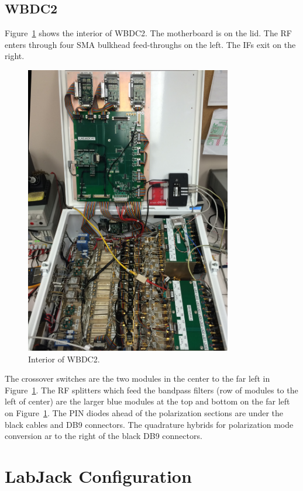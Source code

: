 \documentclass[letterpaper,11pt]{book}
\begin{document}
\section{WBDC2}\label{sec:WBDC2inside}

Figure~\ref{fig:inside} shows the interior of WBDC2.  The motherboard is on the
lid.   The RF enters through four SMA bulkhead feed-throughs on the left.  The
IFs exit on the right.
\begin{figure}[h!tb]
  \begin{center}
    \includegraphics[height=5in]{interior-half.png}
  \end{center}
  \caption{\label{fig:inside}Interior of WBDC2.}
\end{figure}
The crossover switches are the two modules in the
center to the far left in Figure~\ref{fig:inside}.
The RF splitters which feed the bandpass filters (row of modules 
to the left of center) are the
larger blue modules at the top and bottom on the far left on 
Figure~\ref{fig:inside}. 
The PIN diodes ahead of the polarization sections are under the black cables 
and DB9 connectors.
The quadrature hybrids for polarization mode conversion ar to the right of the
black DB9 connectors.

\chapter{LabJack Configuration}
\end{document}
